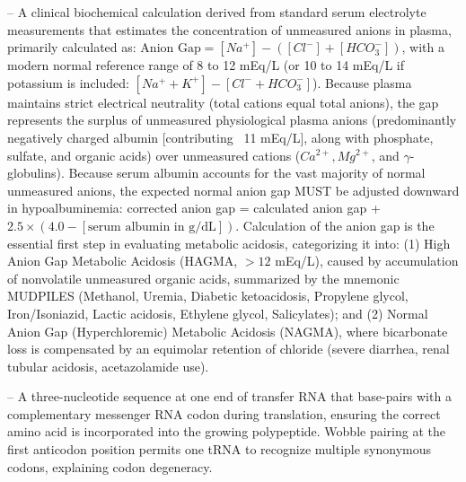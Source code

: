 -- A clinical biochemical calculation derived from standard serum electrolyte measurements that estimates the concentration of unmeasured anions in plasma, primarily calculated as: $\text{Anion Gap} = [Na^+] - ([Cl^-] + [HCO_3^-])$, with a modern normal reference range of 8 to 12 mEq/L (or 10 to 14 mEq/L if potassium is included: $[Na^+ + K^+] - [Cl^- + HCO_3^-]$). Because plasma maintains strict electrical neutrality (total cations equal total anions), the gap represents the surplus of unmeasured physiological plasma anions (predominantly negatively charged albumin [contributing ~11 mEq/L], along with phosphate, sulfate, and organic acids) over unmeasured cations ($Ca^{2+}, Mg^{2+}$, and $\gamma$-globulins). Because serum albumin accounts for the vast majority of normal unmeasured anions, the expected normal anion gap MUST be adjusted downward in hypoalbuminemia: corrected anion gap = calculated anion gap + $2.5 \times (4.0 - [\text{serum albumin in g/dL}])$. Calculation of the anion gap is the essential first step in evaluating metabolic acidosis, categorizing it into: (1) High Anion Gap Metabolic Acidosis (HAGMA, $>12$ mEq/L), caused by accumulation of nonvolatile unmeasured organic acids, summarized by the mnemonic MUDPILES (Methanol, Uremia, Diabetic ketoacidosis, Propylene glycol, Iron/Isoniazid, Lactic acidosis, Ethylene glycol, Salicylates); and (2) Normal Anion Gap (Hyperchloremic) Metabolic Acidosis (NAGMA), where bicarbonate loss is compensated by an equimolar retention of chloride (severe diarrhea, renal tubular acidosis, acetazolamide use).

-- A three-nucleotide sequence at one end of transfer RNA that base-pairs with a complementary messenger RNA codon during translation, ensuring the correct amino acid is incorporated into the growing polypeptide. Wobble pairing at the first anticodon position permits one tRNA to recognize multiple synonymous codons, explaining codon degeneracy.

